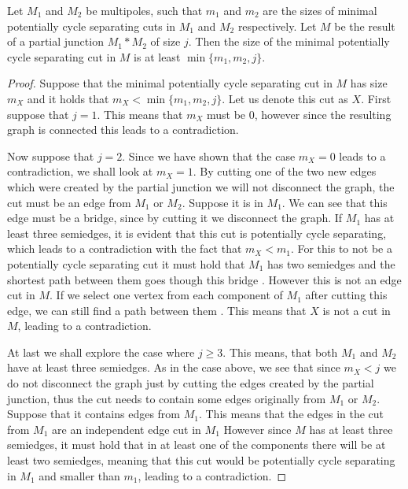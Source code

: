 \documentclass[12pt, twoside]{book}
\begin{document}

\begin{lemma}\label{lem:size-of-minimal-potentially-cycle-separating-after-junction}
	Let $M_1$ and $M_2$ be multipoles, such that $m_1$ and $m_2$ are the sizes of minimal potentially cycle separating cuts in $M_1$ and $M_2$ respectively. Let $M$ be the result of a partial junction $M_1*M_2$ of size $j$. Then the size of the minimal potentially cycle separating cut in $M$ is at least $\min\{m_1,m_2,j\}$.
\end{lemma}

\begin{proof}
	Suppose that the minimal potentially cycle separating cut in $M$ has size $m_X$ and it holds that $m_X<\min\{m_1,m_2,j\}$. Let us denote this cut as $X$. First suppose that $j=1$. This means that $m_X$ must be 0, however since the resulting graph is connected  this leads to a contradiction.
	
	Now suppose that $j=2$. Since we have shown that the case $m_X=0$ leads to a contradiction, we shall look at $m_X=1$. By cutting one of the two new edges which were created by the partial junction we will not disconnect the graph, the cut must be an edge from $M_1$ or $M_2$. Suppose it is in $M_1$. We can see that this edge must be a bridge, since by cutting it we disconnect the graph. If $M_1$ has at least three semiedges, it is evident that this cut is potentially cycle separating, which leads to a contradiction with the fact that $m_X<m_1$. For this to not be a potentially cycle separating cut it must hold that $M_1$ has two semiedges and the shortest path between them goes though this bridge . However this is not an edge cut in $M$. If we select one vertex from each component of $M_1$ after cutting this edge, we can still find a path between them . This means that $X$ is not a cut in $M$, leading to a contradiction.
	
	At last we shall explore the case where $j\geq 3$. This means, that both $M_1$ and $M_2$ have at least three semiedges. As in the case above, we see that since $m_X<j$ we do not disconnect the graph just by cutting the edges created by the partial junction, thus the cut needs to contain some edges originally from $M_1$ or $M_2$. Suppose that it contains edges from $M_1$. This means that the edges in the cut from $M_1$ are an independent edge cut in $M_1$  However since $M$ has at least three semiedges, it must hold that in at least one of the components there will be at least two semiedges, meaning that this cut would be potentially cycle separating in $M_1$ and smaller than $m_1$, leading to a contradiction.
	
\end{proof}
\end{document}
